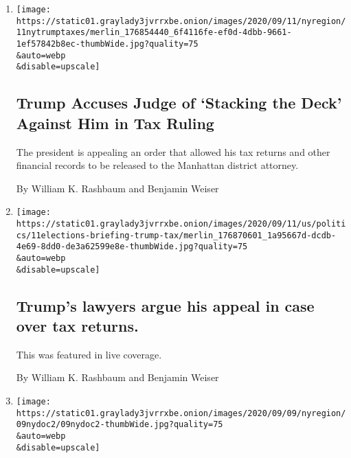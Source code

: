 \begin{enumerate}
\def\labelenumi{\arabic{enumi}.}
\item
  \href{/2020/09/11/nyregion/donald-trump-taxes-cyrus-vance.html}{}

  \texttt{[image: https://static01.graylady3jvrrxbe.onion/images/2020/09/11/nyregion/11nytrumptaxes/merlin\_176854440\_6f4116fe-ef0d-4dbb-9661-1ef57842b8ec-thumbWide.jpg?quality=75\\\&auto=webp\\\&disable=upscale]}

  \hypertarget{trump-accuses-judge-of-stacking-the-deck-against-him-in-tax-ruling}{%
  \subsection{Trump Accuses Judge of `Stacking the Deck' Against Him in
  Tax
  Ruling}\label{trump-accuses-judge-of-stacking-the-deck-against-him-in-tax-ruling}}

  The president is appealing an order that allowed his tax returns and
  other financial records to be released to the Manhattan district
  attorney.

  By William K. Rashbaum and Benjamin Weiser
\item
  \href{/live/2020/09/11/us/trump-vs-biden/trumps-lawyers-argue-his-appeal-in-case-over-tax-returns}{}

  \texttt{[image: https://static01.graylady3jvrrxbe.onion/images/2020/09/11/us/politics/11elections-briefing-trump-tax/merlin\_176870601\_1a95667d-dcdb-4e69-8dd0-de3a62599e8e-thumbWide.jpg?quality=75\\\&auto=webp\\\&disable=upscale]}

  \hypertarget{trumps-lawyers-argue-his-appeal-in-case-over-tax-returns}{%
  \subsection{Trump's lawyers argue his appeal in case over tax
  returns.}\label{trumps-lawyers-argue-his-appeal-in-case-over-tax-returns}}

  This was featured in live coverage.

  By William K. Rashbaum and Benjamin Weiser
\item
  \href{/2020/09/09/nyregion/robert-hadden-gynecologist-indicted.html}{}

  \texttt{[image: https://static01.graylady3jvrrxbe.onion/images/2020/09/09/nyregion/09nydoc2/09nydoc2-thumbWide.jpg?quality=75\\\&auto=webp\\\&disable=upscale]}

  \hypertarget{nyc-gynecologist-faces-federal-charges-over-6-sex-abuse-accusations}{%
}
\end{enumerate}

